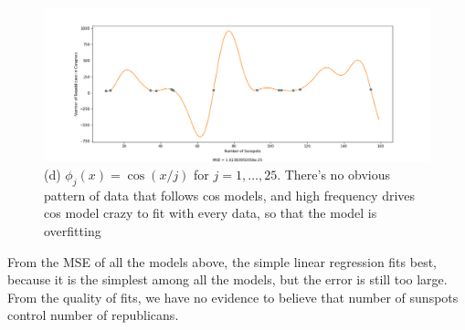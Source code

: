 \documentclass[submit]{harvardml}
\begin{document}
\begin{itemize}
\begin{figure}[h]
\centering
\includegraphics[width=\textwidth]{data/2_d_2}
\caption{(d) $\phi_j(x) = \cos(x / j)$ for $j=1, \ldots, 25$. There's no obvious pattern of data that follows cos models, and high frequency drives cos model crazy to fit with every data, so that the model is overfitting}
\label{fig:2_d_2}
\end{figure}
From the MSE of all the models above, the simple linear regression fits best, because it is the simplest among all the models, but the error is still too large. From the quality of fits, we have no evidence to believe that number of sunspots control number of republicans.
\end{itemize}
\end{document}
